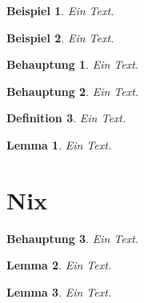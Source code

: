 \documentclass{scrartcl}
\newtheorem{beisp}{Beispiel}
\newtheorem{behaupt}{Behauptung}
\newtheorem{defin}[beisp]{Definition}
\newtheorem{lemma}{Lemma}[section]
\begin{document}
\begin{beisp}Ein Text.\end{beisp}
\begin{beisp}Ein Text.\end{beisp}
\begin{behaupt}Ein Text.\end{behaupt}
\begin{behaupt}Ein Text.\end{behaupt}
\begin{defin}Ein Text.\end{defin}
\begin{lemma}Ein Text.\end{lemma}

\section{Nix}
\begin{behaupt}Ein Text.\end{behaupt}
\begin{lemma}Ein Text.\end{lemma}
\begin{lemma}Ein Text.\end{lemma}
\end{document}
